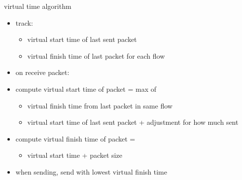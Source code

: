 \begin{frame}{virtual time algorithm}
    \begin{itemize}
    \item track:
        \begin{itemize}
        \item virtual start time of last sent packet
        \item virtual finish time of last packet for each flow
        \end{itemize}
    \vspace{.5cm}
    \item on receive packet:
    \item compute virtual start time of packet =  max of
        \begin{itemize}
        \item virtual finish time from last packet in same flow
        \item virtual start time of last sent packet + adjustment for how much sent
        \end{itemize}
    \item compute virtual finish time of packet = 
        \begin{itemize}
        \item virtual start time + packet size
        \end{itemize}
    \vspace{.5cm}
    \item when sending, send with lowest virtual finish time
    \end{itemize}
\end{frame}
